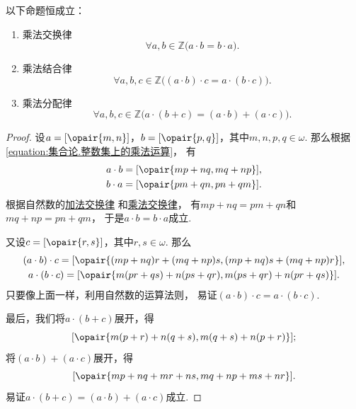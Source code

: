 \begin{theorem}\label{theorem:集合论.整数乘法的运算法则1}
以下命题恒成立：
\begin{enumerate}
	\item 乘法交换律
	\begin{equation}\label{equation:集合论.整数乘法交换律}
		\forall a,b\in\mathbb{Z} \bigl(
			a \cdot b = b \cdot a
		\bigr).
	\end{equation}
	\item 乘法结合律
	\begin{equation}\label{equation:集合论.整数乘法结合律}
		\forall a,b,c\in\mathbb{Z} \bigl(
			(a \cdot b) \cdot c = a \cdot (b \cdot c)
		\bigr).
	\end{equation}
	\item 乘法分配律
	\begin{equation}\label{equation:集合论.整数乘法分配律}
		\forall a,b,c\in\mathbb{Z} \bigl(
			a \cdot (b + c) = (a \cdot b) + (a \cdot c)
		\bigr).
	\end{equation}
\end{enumerate}
\begin{proof}
设\(a=\EquivalenceClassB{\opair{m,n}}[\sim]\)，\(b=\EquivalenceClassB{\opair{p,q}}[\sim]\)，其中\(m,n,p,q\in\omega\).
那么根据\cref{equation:集合论.整数集上的乘法运算}，
有\begin{gather*}
	a \cdot b = \EquivalenceClassB{\opair{mp+nq,mq+np}}[\sim], \\
	b \cdot a = \EquivalenceClassB{\opair{pm+qn,pn+qm}}[\sim].
\end{gather*}
根据自然数的\hyperref[equation:集合论.自然数加法交换律]{加法交换律}%
和\hyperref[equation:集合论.自然数乘法交换律]{乘法交换律}，
有\(mp+nq=pm+qn\)和\(mq+np=pn+qm\)，
于是\(a \cdot b = b \cdot a\)成立.

又设\(c=\EquivalenceClassB{\opair{r,s}}[\sim]\)，其中\(r,s\in\omega\).
那么\begin{gather*}
	(a \cdot b) \cdot c
	= \EquivalenceClassB{\opair{(mp+nq)r+(mq+np)s,(mp+nq)s+(mq+np)r}}[\sim], \\
	a \cdot (b \cdot c)
	= \EquivalenceClassB{\opair{m(pr+qs)+n(ps+qr),m(ps+qr)+n(pr+qs)}}[\sim].
\end{gather*}
只要像上面一样，利用自然数的运算法则，
易证\((a \cdot b) \cdot c = a \cdot (b \cdot c)\).

最后，我们将\(a \cdot (b+c)\)展开，得\begin{equation*}
	\EquivalenceClassB{\opair{m(p+r)+n(q+s),m(q+s)+n(p+r)}}[\sim];
\end{equation*}
将\((a \cdot b) + (a \cdot c)\)展开，得\begin{equation*}
	\EquivalenceClassB{\opair{mp+nq+mr+ns,mq+np+ms+nr}}[\sim].
\end{equation*}
易证\(a \cdot (b + c) = (a \cdot b) + (a \cdot c)\)成立.
\end{proof}
\end{theorem}

